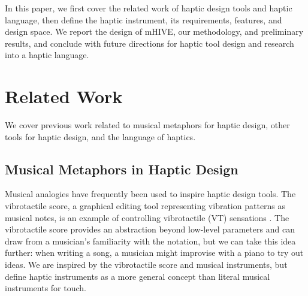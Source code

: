 \noindent
 In this paper, we first cover the related work of haptic design tools and haptic language, then define the haptic instrument, its requirements, features, and design space.
We report the design of mHIVE,
our methodology, and preliminary results, and
 conclude with future directions for haptic tool design and research into a haptic language.




%
% 
\section{Related Work}
We cover previous work related to musical metaphors for haptic design, other tools for haptic design, and the language of haptics.


\subsection{Musical Metaphors in Haptic Design}
Musical analogies have frequently been used to inspire haptic design tools. %
The vibrotactile score, a graphical editing tool representing vibration patterns as musical notes, is an example of controlling vibrotactile (VT)
%
sensations \cite{Lee2012, Lee2009}.
The vibrotactile score provides an abstraction beyond low-level parameters and can draw from a musician's familiarity with the notation, but we can take this idea further:
when writing a song, a musician might improvise with a piano to try out ideas.
We are inspired by the vibrotactile score and musical instruments, %
but define haptic instruments as a more general concept than literal musical instruments for touch.



